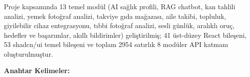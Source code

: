Proje kapsamında 13 temel modül (AI sağlık profili, RAG chatbot, kan tahlili analizi, yemek fotoğraf analizi, takviye gıda mağazası, aile takibi, topluluk, giyilebilir cihaz entegrasyonu, tıbbi fotoğraf analizi, sesli günlük, aralıklı oruç, hedefler ve başarımlar, akıllı bildirimler) geliştirilmiş; 41 üst-düzey React bileşeni, 53 shadcn/ui temel bileşeni ve toplam 2954 satırlık 8 modüler API katmanı oluşturulmuştur.

\vspace{0.5cm}
\noindent\textbf{Anahtar Kelimeler:} \keywordsTR
